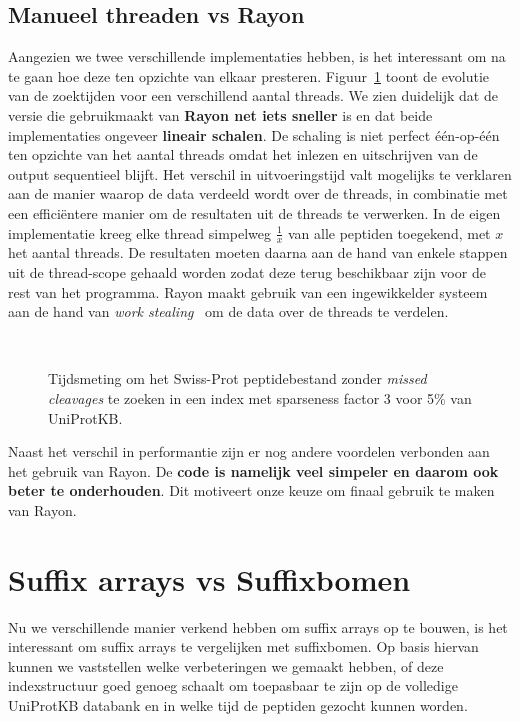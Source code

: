 \subsection{Manueel threaden vs Rayon}\label{subsec:manueel-threaden-vs-rayon}
Aangezien we twee verschillende implementaties hebben, is het interessant om na te gaan hoe deze ten opzichte van elkaar presteren.
Figuur~\ref{fig:threading_default_vs_rayon} toont de evolutie van de zoektijden voor een verschillend aantal threads.
We zien duidelijk dat de versie die gebruikmaakt van \textbf{Rayon net iets sneller} is en dat beide implementaties ongeveer \textbf{lineair schalen}.
De schaling is niet perfect één-op-één ten opzichte van het aantal threads omdat het inlezen en uitschrijven van de output sequentieel blijft.
Het verschil in uitvoeringstijd valt mogelijks te verklaren aan de manier waarop de data verdeeld wordt over de threads, in combinatie met een efficiëntere manier om de resultaten uit de threads te verwerken.
In de eigen implementatie kreeg elke thread simpelweg $\frac{1}{x}$ van alle peptiden toegekend, met $x$ het aantal threads.
De resultaten moeten daarna aan de hand van enkele stappen uit de thread-scope gehaald worden zodat deze terug beschikbaar zijn voor de rest van het programma.
Rayon maakt gebruik van een ingewikkelder systeem aan de hand van \textit{work stealing}~\cite{rayon_stealing} om de data over de threads te verdelen.

\begin{figure}[H]
    \centering
    \\[4ex] %

    \caption{Tijdsmeting om het Swiss-Prot peptidebestand zonder \textit{missed cleavages} te zoeken in een index met sparseness factor 3 voor 5\% van UniProtKB.}\label{fig:threading_default_vs_rayon}
\end{figure}

Naast het verschil in performantie zijn er nog andere voordelen verbonden aan het gebruik van Rayon.
De \textbf{code is namelijk veel simpeler en daarom ook beter te onderhouden}.
Dit motiveert onze keuze om finaal gebruik te maken van Rayon.


\section{Suffix arrays vs Suffixbomen}\label{sec:performantie}
Nu we verschillende manier verkend hebben om suffix arrays op te bouwen, is het interessant om suffix arrays te vergelijken met suffixbomen.
Op basis hiervan kunnen we vaststellen welke verbeteringen we gemaakt hebben, of deze indexstructuur goed genoeg schaalt om toepasbaar te zijn op de volledige UniProtKB databank en in welke tijd de peptiden gezocht kunnen worden.

